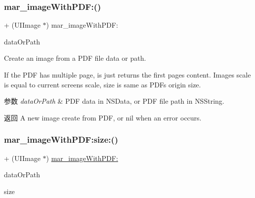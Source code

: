 \subsubsection{\texorpdfstring{mar\+\_\+image\+With\+P\+D\+F\+:()}{mar\_imageWithPDF:()}}
{\footnotesize\ttfamily + (U\+I\+Image $\ast$) mar\+\_\+image\+With\+P\+D\+F\+: \begin{DoxyParamCaption}\item[{(id)}]{data\+Or\+Path }\end{DoxyParamCaption}}

Create an image from a P\+DF file data or path.

If the P\+DF has multiple page, is just return\textquotesingle{}s the first page\textquotesingle{}s content. Image\textquotesingle{}s scale is equal to current screen\textquotesingle{}s scale, size is same as P\+DF\textquotesingle{}s origin size.


\begin{DoxyParams}{参数}
{\em data\+Or\+Path} & P\+DF data in {\ttfamily N\+S\+Data}, or P\+DF file path in {\ttfamily N\+S\+String}.\\
\hline
\end{DoxyParams}
\begin{DoxyReturn}{返回}
A new image create from P\+DF, or nil when an error occurs. 
\end{DoxyReturn}
\mbox{\label{category_u_i_image_07_m_a_r_e_x_08_a53a3e8db1581454b9ff3e356a9730722}} 
\subsubsection{\texorpdfstring{mar\+\_\+image\+With\+P\+D\+F\+:size\+:()}{mar\_imageWithPDF:size:()}}
{\footnotesize\ttfamily + (U\+I\+Image $\ast$) \hyperlink{category_u_i_image_07_m_a_r_e_x_08_a34a99e3b432978039bfcfdb05a34cfef}{mar\+\_\+image\+With\+P\+D\+F\+:} \begin{DoxyParamCaption}\item[{(id)}]{data\+Or\+Path }\item[{size:(C\+G\+Size)}]{size }\end{DoxyParamCaption}}


